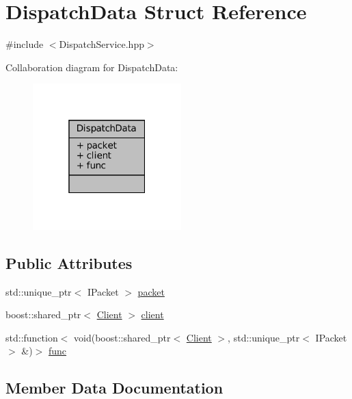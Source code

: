 \hypertarget{structDispatchData}{}\section{Dispatch\+Data Struct Reference}
\label{structDispatchData}


{\ttfamily \#include $<$Dispatch\+Service.\+hpp$>$}



Collaboration diagram for Dispatch\+Data\+:
\nopagebreak
\begin{figure}[H]
\begin{center}
\leavevmode
\includegraphics[width=163pt]{structDispatchData__coll__graph}
\end{center}
\end{figure}
\subsection*{Public Attributes}
\begin{DoxyCompactItemize}
\item 
std\+::unique\+\_\+ptr$<$ I\+Packet $>$ \mbox{\hyperlink{structDispatchData_a73c4113d390c2df0b035e7e89ea829b4}{packet}}
\item 
boost\+::shared\+\_\+ptr$<$ \mbox{\hyperlink{classClient}{Client}} $>$ \mbox{\hyperlink{structDispatchData_a05f2c90200f8ef88bd63f3a7f63aa630}{client}}
\item 
std\+::function$<$ void(boost\+::shared\+\_\+ptr$<$ \mbox{\hyperlink{classClient}{Client}} $>$, std\+::unique\+\_\+ptr$<$ I\+Packet $>$ \&)$>$ \mbox{\hyperlink{structDispatchData_a6672e8f2dfa81cd5b386c1cc96a1c2f6}{func}}
\end{DoxyCompactItemize}


\subsection{Member Data Documentation}
\mbox{\label{structDispatchData_a05f2c90200f8ef88bd63f3a7f63aa630}} 
